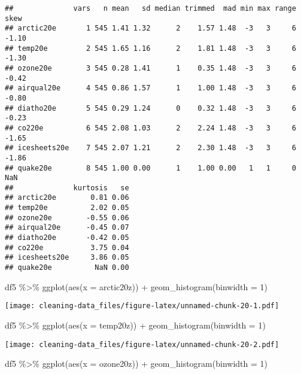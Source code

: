 \documentclass[
]{article}
\newenvironment{Shaded}{\begin{snugshade}}{\end{snugshade}}
\newcommand{\AttributeTok}[1]{\textcolor[rgb]{0.77,0.63,0.00}{#1}}
\newcommand{\DecValTok}[1]{\textcolor[rgb]{0.00,0.00,0.81}{#1}}
\newcommand{\FunctionTok}[1]{\textcolor[rgb]{0.00,0.00,0.00}{#1}}
\newcommand{\NormalTok}[1]{#1}
\newcommand{\SpecialCharTok}[1]{\textcolor[rgb]{0.00,0.00,0.00}{#1}}
\begin{document}
\begin{verbatim}
##              vars   n mean   sd median trimmed  mad min max range  skew
## arctic20e       1 545 1.41 1.32      2    1.57 1.48  -3   3     6 -1.10
## temp20e         2 545 1.65 1.16      2    1.81 1.48  -3   3     6 -1.30
## ozone20e        3 545 0.28 1.41      1    0.35 1.48  -3   3     6 -0.42
## airqual20e      4 545 0.86 1.57      1    1.00 1.48  -3   3     6 -0.80
## diatho20e       5 545 0.29 1.24      0    0.32 1.48  -3   3     6 -0.23
## co220e          6 545 2.08 1.03      2    2.24 1.48  -3   3     6 -1.65
## icesheets20e    7 545 2.07 1.21      2    2.30 1.48  -3   3     6 -1.86
## quake20e        8 545 1.00 0.00      1    1.00 0.00   1   1     0   NaN
##              kurtosis   se
## arctic20e        0.81 0.06
## temp20e          2.02 0.05
## ozone20e        -0.55 0.06
## airqual20e      -0.45 0.07
## diatho20e       -0.42 0.05
## co220e           3.75 0.04
## icesheets20e     3.86 0.05
## quake20e          NaN 0.00
\end{verbatim}

\begin{Shaded}
\begin{Highlighting}[]
\NormalTok{df5 }\SpecialCharTok{\%\textgreater{}\%}
  \FunctionTok{ggplot}\NormalTok{(}\FunctionTok{aes}\NormalTok{(}\AttributeTok{x =}\NormalTok{ arctic20z)) }\SpecialCharTok{+}
  \FunctionTok{geom\_histogram}\NormalTok{(}\AttributeTok{binwidth =} \DecValTok{1}\NormalTok{)}
\end{Highlighting}
\end{Shaded}

\texttt{[image: cleaning-data\_files/figure-latex/unnamed-chunk-20-1.pdf]}

\begin{Shaded}
\begin{Highlighting}[]
\NormalTok{df5 }\SpecialCharTok{\%\textgreater{}\%}
  \FunctionTok{ggplot}\NormalTok{(}\FunctionTok{aes}\NormalTok{(}\AttributeTok{x =}\NormalTok{ temp20z)) }\SpecialCharTok{+}
  \FunctionTok{geom\_histogram}\NormalTok{(}\AttributeTok{binwidth =} \DecValTok{1}\NormalTok{)}
\end{Highlighting}
\end{Shaded}

\texttt{[image: cleaning-data\_files/figure-latex/unnamed-chunk-20-2.pdf]}

\begin{Shaded}
\begin{Highlighting}[]
\NormalTok{df5 }\SpecialCharTok{\%\textgreater{}\%}
  \FunctionTok{ggplot}\NormalTok{(}\FunctionTok{aes}\NormalTok{(}\AttributeTok{x =}\NormalTok{ ozone20z)) }\SpecialCharTok{+}
  \FunctionTok{geom\_histogram}\NormalTok{(}\AttributeTok{binwidth =} \DecValTok{1}\NormalTok{)}
\end{Highlighting}
\end{Shaded}
\end{document}
